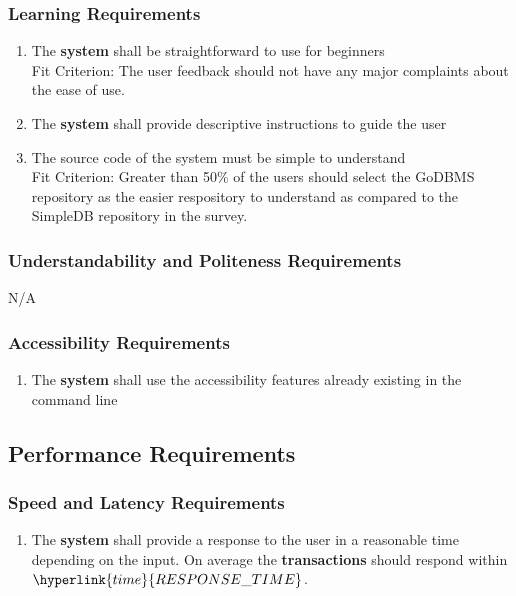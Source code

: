 \documentclass[12pt, titlepage]{article}
\begin{document}
    \subsubsection{Learning Requirements}
        \begin{enumerate}
            \item The \textbf{system} shall be straightforward to use for beginners\\
            {\color{red}Fit Criterion: The user feedback should not have any major complaints about the ease of use.}
            \item The \textbf{system} shall provide descriptive instructions to guide the user
            \item {\color{red} The source code of the system must be simple to understand}\\
            {\color{red}Fit Criterion: Greater than 50\% of the users should select the GoDBMS repository as the easier respository to understand as compared to the SimpleDB repository in the survey.}
        \end{enumerate}
    \subsubsection{Understandability and Politeness Requirements}
        N/A
    \subsubsection{Accessibility Requirements}
        \begin{enumerate}
            \item The \textbf{system} shall use the accessibility features already existing in the command line
        \end{enumerate}
\subsection{Performance Requirements}
    \subsubsection{Speed and Latency Requirements}
        \begin{enumerate}
            \item The \textbf{system} shall provide a response to the user in a reasonable time depending on the input. On average the \textbf{transactions} should respond within $\hyperlink{time}{RESPONSE\_TIME}$.
        \end{enumerate}
\end{document}
